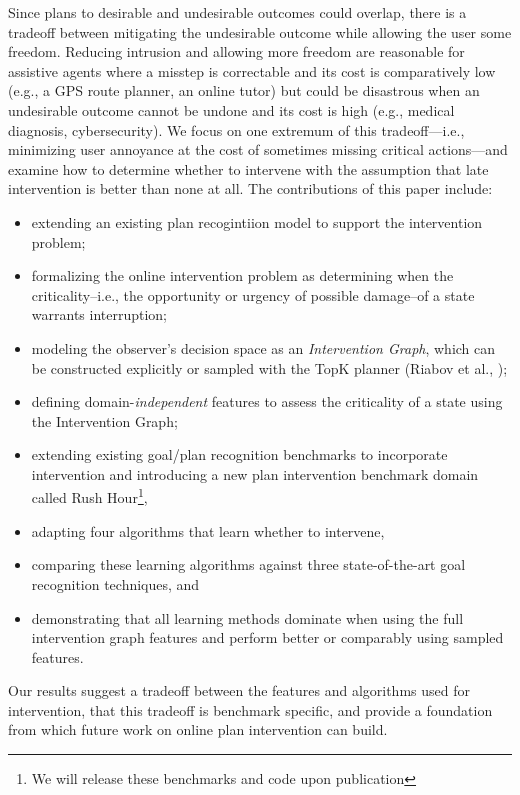 \documentclass[letterpaper]{article}
\theoremstyle{plain}
\begin{document}
Since plans to desirable and undesirable outcomes could overlap, there is a tradeoff between mitigating the undesirable outcome while allowing the user some freedom.  
Reducing intrusion and allowing more freedom are reasonable for assistive agents where a misstep is correctable and its cost is comparatively low (e.g., a GPS route planner, an online tutor) but could be disastrous when an undesirable outcome cannot be undone and its cost is high (e.g., medical diagnosis, cybersecurity).  
We focus on one extremum of this tradeoff---i.e., minimizing user annoyance at the cost of sometimes missing critical actions---and examine how to determine whether to intervene with the assumption that late intervention is better than none at all.
The contributions of this paper include:
\begin{itemize}
\item extending an existing plan recogintiion model to support the intervention problem;
\item formalizing the online intervention problem as determining when the criticality--i.e., the opportunity or urgency of possible damage--of a state warrants interruption; 
\item modeling the observer's decision space as an \emph{Intervention Graph}, which can be constructed explicitly or sampled with the TopK planner (Riabov et al., \citeyear{riabov2014});
\item defining domain-\emph{independent} features to assess the criticality of a state using the Intervention Graph;
\item extending existing goal/plan recognition benchmarks \cite{ramirez2009plan,ramirez2010probabilistic} to incorporate intervention and introducing a new plan intervention benchmark domain called Rush Hour\footnote{We will release these benchmarks and code upon publication}, 
\item adapting four algorithms that learn whether to intervene, 
\item comparing these learning algorithms against three state-of-the-art goal recognition techniques, and
\item demonstrating that all learning methods dominate when using the full intervention graph features and perform better or comparably using sampled features.
\end{itemize}
Our results suggest a tradeoff between the features and algorithms used for intervention, that this tradeoff is benchmark specific, and provide a foundation from which future work on online plan intervention can build.
\end{document}
